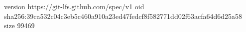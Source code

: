version https://git-lfs.github.com/spec/v1
oid sha256:39ca532c04c3eb5c460a910a23ed47fedcf8f582771dd02f63acfa64d6d25a58
size 99469
